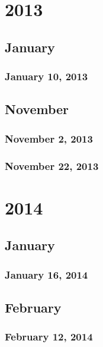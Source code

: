 \part{2013}
\chapter{January}
\section{January 10, 2013}


\chapter{November}
\section{November 2, 2013}


\section{November 22, 2013}

\part{2014}
\chapter{January}
\section{January 16, 2014}



\chapter{February}
\section{February 12, 2014}

